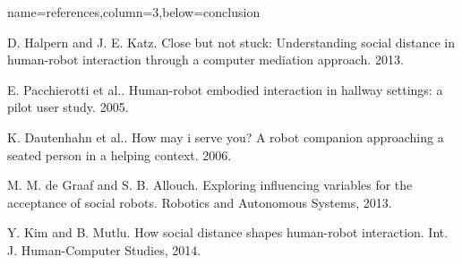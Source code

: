 \documentclass[paperwidth=118cm,paperheight=84cm,landscape,fontscale=0.2941]{baposter}
\begin{document}
\begin{poster}


{name=references,column=3,below=conclusion}
{
\renewcommand{\section}[2]{}%
\footnotesize
\noindent [1] D. Halpern and J. E. Katz. Close but not stuck: Understanding social distance in human-robot interaction through a computer mediation approach. 2013.

\vspace{1pt} 
\noindent [2] E. Pacchierotti et al.. Human-robot embodied interaction in hallway settings: a pilot user study. 2005.

\vspace{1pt}
\noindent[3] K. Dautenhahn et al.. How may i serve you? A robot companion approaching a seated person in a helping context. 2006.

\vspace{1pt}
\noindent [4] M. M. de Graaf and S. B. Allouch. Exploring influencing variables for the acceptance of social robots. Robotics and Autonomous Systems, 2013.

\vspace{1pt}
\noindent [5] Y. Kim and B. Mutlu. How social distance shapes human-robot interaction. Int. J. Human-Computer Studies, 2014.\\

}



\end{poster}
\end{document}
